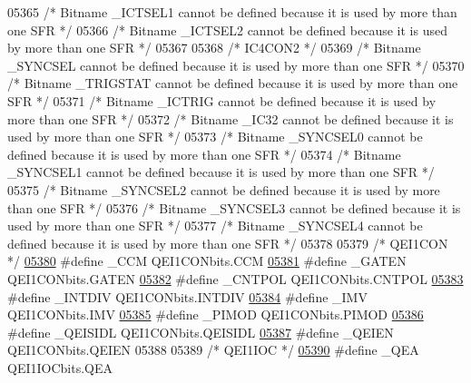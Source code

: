 \begin{DoxyCode}
05365 \textcolor{comment}{/* Bitname \_ICTSEL1 cannot be defined because it is used by more than one SFR */}
05366 \textcolor{comment}{/* Bitname \_ICTSEL2 cannot be defined because it is used by more than one SFR */}
05367 
05368 \textcolor{comment}{/* IC4CON2 */}
05369 \textcolor{comment}{/* Bitname \_SYNCSEL cannot be defined because it is used by more than one SFR */}
05370 \textcolor{comment}{/* Bitname \_TRIGSTAT cannot be defined because it is used by more than one SFR */}
05371 \textcolor{comment}{/* Bitname \_ICTRIG cannot be defined because it is used by more than one SFR */}
05372 \textcolor{comment}{/* Bitname \_IC32 cannot be defined because it is used by more than one SFR */}
05373 \textcolor{comment}{/* Bitname \_SYNCSEL0 cannot be defined because it is used by more than one SFR */}
05374 \textcolor{comment}{/* Bitname \_SYNCSEL1 cannot be defined because it is used by more than one SFR */}
05375 \textcolor{comment}{/* Bitname \_SYNCSEL2 cannot be defined because it is used by more than one SFR */}
05376 \textcolor{comment}{/* Bitname \_SYNCSEL3 cannot be defined because it is used by more than one SFR */}
05377 \textcolor{comment}{/* Bitname \_SYNCSEL4 cannot be defined because it is used by more than one SFR */}
05378 
05379 \textcolor{comment}{/* QEI1CON */}
\hypertarget{a00015_source_l05380}{}\hyperlink{a00015_ae942122648cf5964ccf7051bbe207deb}{05380} \textcolor{preprocessor}{#define \_CCM QEI1CONbits.CCM}
\hypertarget{a00015_source_l05381}{}\hyperlink{a00015_a6a71a69f82c8b698c6da5a0251c5545b}{05381} \textcolor{preprocessor}{#define \_GATEN QEI1CONbits.GATEN}
\hypertarget{a00015_source_l05382}{}\hyperlink{a00015_a0df96963175459cd315e9a22e40a4103}{05382} \textcolor{preprocessor}{#define \_CNTPOL QEI1CONbits.CNTPOL}
\hypertarget{a00015_source_l05383}{}\hyperlink{a00015_a8c807c487ee98e616cb05375ea698c32}{05383} \textcolor{preprocessor}{#define \_INTDIV QEI1CONbits.INTDIV}
\hypertarget{a00015_source_l05384}{}\hyperlink{a00015_ac100a07f49b1f8f93bbe1f801ff7a815}{05384} \textcolor{preprocessor}{#define \_IMV QEI1CONbits.IMV}
\hypertarget{a00015_source_l05385}{}\hyperlink{a00015_a07603307dbd9b4c727b35190145fb076}{05385} \textcolor{preprocessor}{#define \_PIMOD QEI1CONbits.PIMOD}
\hypertarget{a00015_source_l05386}{}\hyperlink{a00015_a6400837b56af913898a3461252a8bb04}{05386} \textcolor{preprocessor}{#define \_QEISIDL QEI1CONbits.QEISIDL}
\hypertarget{a00015_source_l05387}{}\hyperlink{a00015_aefbc9d2b99e8a5fa02293082e0be0869}{05387} \textcolor{preprocessor}{#define \_QEIEN QEI1CONbits.QEIEN}
05388 
05389 \textcolor{comment}{/* QEI1IOC */}
\hypertarget{a00015_source_l05390}{}\hyperlink{a00015_a0b61c1a775ea81841b8dc27bb53469cb}{05390} \textcolor{preprocessor}{#define \_QEA QEI1IOCbits.QEA}

\end{DoxyCode}
